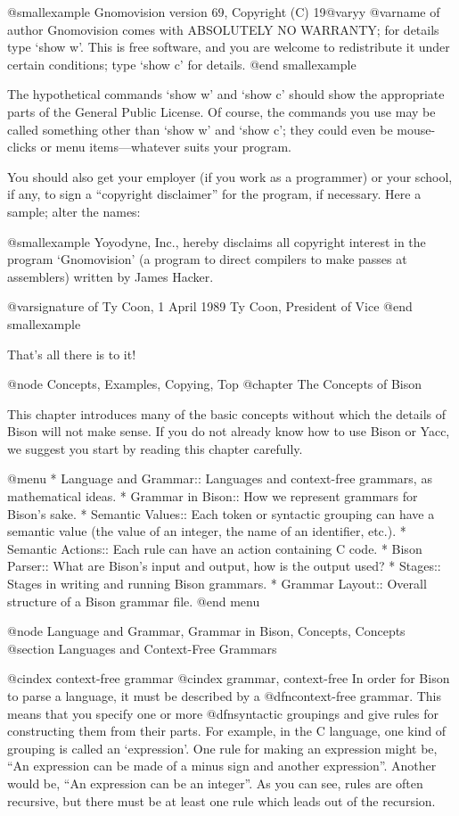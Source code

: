 @smallexample
Gnomovision version 69, Copyright (C) 19@var{yy} @var{name of author}
Gnomovision comes with ABSOLUTELY NO WARRANTY; for details type `show w'.
This is free software, and you are welcome to redistribute it
under certain conditions; type `show c' for details.
@end smallexample

The hypothetical commands `show w' and `show c' should show the
appropriate parts of the General Public License.  Of course, the
commands you use may be called something other than `show w' and `show
c'; they could even be mouse-clicks or menu items---whatever suits your
program.

You should also get your employer (if you work as a programmer) or your
school, if any, to sign a ``copyright disclaimer'' for the program, if
necessary.  Here a sample; alter the names:

@smallexample
Yoyodyne, Inc., hereby disclaims all copyright interest in the program
`Gnomovision' (a program to direct compilers to make passes at
assemblers) written by James Hacker.

@var{signature of Ty Coon}, 1 April 1989
Ty Coon, President of Vice
@end smallexample

That's all there is to it!

@node Concepts, Examples, Copying, Top
@chapter The Concepts of Bison

This chapter introduces many of the basic concepts without which the
details of Bison will not make sense.  If you do not already know how to
use Bison or Yacc, we suggest you start by reading this chapter carefully.

@menu
* Language and Grammar::  Languages and context-free grammars,
                            as mathematical ideas.
* Grammar in Bison::      How we represent grammars for Bison's sake.
* Semantic Values::       Each token or syntactic grouping can have
                            a semantic value (the value of an integer,
                            the name of an identifier, etc.).
* Semantic Actions::      Each rule can have an action containing C code.
* Bison Parser::          What are Bison's input and output,
                            how is the output used?
* Stages::                Stages in writing and running Bison grammars.
* Grammar Layout::        Overall structure of a Bison grammar file.
@end menu

@node Language and Grammar, Grammar in Bison, Concepts, Concepts
@section Languages and Context-Free Grammars

@cindex context-free grammar
@cindex grammar, context-free
In order for Bison to parse a language, it must be described by a
@dfn{context-free grammar}.  This means that you specify one or more
@dfn{syntactic groupings} and give rules for constructing them from their
parts.  For example, in the C language, one kind of grouping is called an
`expression'.  One rule for making an expression might be, ``An expression
can be made of a minus sign and another expression''.  Another would be,
``An expression can be an integer''.  As you can see, rules are often
recursive, but there must be at least one rule which leads out of the
recursion.

